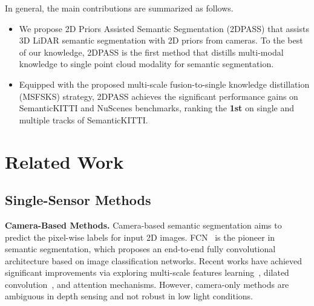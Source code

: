 \documentclass[runningheads]{llncs}
\begin{document}
	
	In general, the main contributions are summarized as follows.
	\begin{itemize}
		\item We propose {2D Priors Assisted Semantic Segmentation} ({2DPASS}) that assists 3D LiDAR semantic segmentation with 2D priors from cameras. To the best of our knowledge, 2DPASS is the first method that distills multi-modal knowledge to single point cloud modality for semantic segmentation.
		
		\item Equipped with the proposed multi-scale fusion-to-single knowledge distillation (MSFSKS) strategy, 2DPASS achieves the significant performance gains on SemanticKITTI and NuScenes benchmarks, ranking the \textbf{1st} on single and multiple tracks of SemanticKITTI.
	\end{itemize}
	
	
	\section{Related Work}
	\subsection{Single-Sensor Methods}
	
	\noindent\textbf{Camera-Based Methods. }
	Camera-based semantic segmentation aims to predict the pixel-wise labels for input 2D images. 
FCN~\cite{long2015fully} is the pioneer in semantic segmentation, which proposes an end-to-end fully convolutional architecture based on image classification networks. 
Recent works have achieved significant improvements via exploring multi-scale features learning~\cite{chen2017deeplab,lin2016efficient,zhao2017pyramid}, dilated convolution~\cite{wang2018understanding,chen2017rethinking}, and attention mechanisms\cite{huang2019ccnet,yuan2018ocnet}. 
However, camera-only methods are ambiguous in depth sensing and not robust in low light conditions.
	
\end{document}
